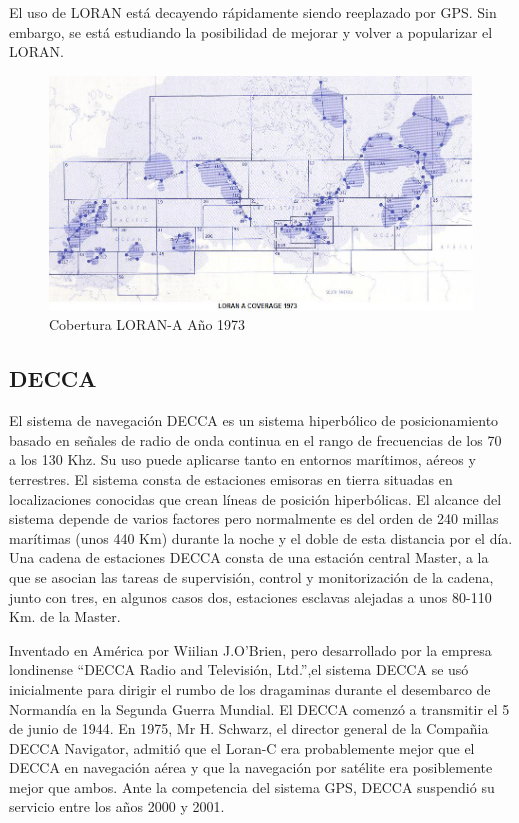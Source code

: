 El uso de LORAN est\'a decayendo r\'apidamente siendo reeplazado por GPS. Sin embargo, se est\'a estudiando la posibilidad de mejorar y volver a popularizar el LORAN.

\begin{figure}[!tbh]
  \centering
    \includegraphics[width=\textwidth]{Imagenes/06.01.adf/Loran_A_Coverage_1973.jpg}
  \caption{Cobertura LORAN-A A\~no 1973 \cite{loran-history-info}}
  \label{fig:LORAN-A-cobertura-1973}
\end{figure}

\subsection{DECCA}

El sistema de navegaci\'on DECCA es un sistema hiperb\'olico de posicionamiento basado en se\~nales de radio de onda continua en el rango de frecuencias de los 70 a los 130 Khz. Su uso puede aplicarse tanto en entornos mar\'itimos, a\'ereos y terrestres. El sistema consta de estaciones emisoras en tierra situadas en localizaciones conocidas que crean l\'ineas de posici\'on hiperb\'olicas. El alcance del sistema depende de varios factores pero normalmente es del orden de 240 millas mar\'itimas (unos 440 Km) durante la noche y el doble de esta distancia por el d\'ia. Una cadena de estaciones DECCA consta de una estaci\'on central Master, a la que se asocian las tareas de supervisi\'on, control y monitorizaci\'on de la cadena, junto con tres, en algunos casos dos, estaciones esclavas alejadas a unos 80-110 Km. de la Master.

Inventado en Am\'erica por Wiilian J.O'Brien, pero desarrollado por la empresa londinense ``DECCA Radio and Televisi\'on, Ltd.'',el sistema DECCA se us\'o inicialmente para dirigir el rumbo de los dragaminas durante el desembarco de Normand\'ia en la Segunda Guerra Mundial. El DECCA comenz\'o a transmitir el 5 de junio de 1944. En 1975, Mr H. Schwarz, el director general de la Compa\~nia DECCA Navigator, admiti\'o que el Loran-C era probablemente mejor que el DECCA en navegaci\'on a\'erea y que la navegaci\'on por sat\'elite era posiblemente mejor que ambos. Ante la competencia del sistema GPS, DECCA suspendi\'o su servicio entre los a\~nos 2000 y 2001.\cite{wikipedia_esp}

